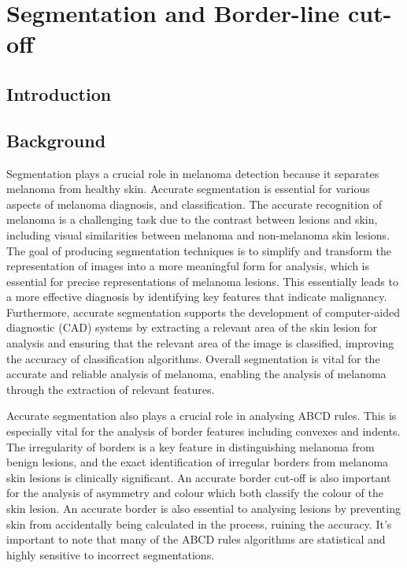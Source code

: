 \chapter{Segmentation and Border-line cut-off}

\section{Introduction}


\section{Background}
Segmentation plays a crucial role in melanoma detection because it separates melanoma from healthy skin. Accurate segmentation is essential for various aspects of melanoma diagnosis, and classification\cite{Albahli2020}. The accurate recognition of melanoma is a challenging task due to the contrast between lesions and skin, including visual similarities between melanoma and non-melanoma skin lesions\cite{li2018}. The goal of producing segmentation techniques is to simplify and transform the representation of images into a more meaningful form for analysis, which is essential for precise representations of melanoma lesions\cite{Masood2013}. This essentially leads to a more effective diagnosis by identifying key features that indicate malignancy\cite{ali2023}. Furthermore, accurate segmentation supports the development of computer-aided diagnostic (CAD) systems by extracting a relevant area of the skin lesion for analysis and ensuring that the relevant area of the image is classified, improving the accuracy of classification algorithms\cite{bi2019}. Overall segmentation is vital for the accurate and reliable analysis of melanoma, enabling the analysis of melanoma through the extraction of relevant features.

Accurate segmentation also plays a crucial role in analysing ABCD rules\cite{Lee2020}. This is especially vital for the analysis of border features\cite{Pereira2020, Kaya2016} including convexes and indents. The irregularity of borders is a key feature in distinguishing melanoma from benign lesions, and the exact identification of irregular borders from melanoma skin lesions is clinically significant\cite{patil2021}. An accurate border cut-off is also important for the analysis of asymmetry and colour which both classify the colour of the skin lesion. An accurate border is also essential to analysing lesions by preventing skin from accidentally being calculated in the process, ruining the accuracy. It's important to note that many of the ABCD rules algorithms are statistical and highly sensitive to incorrect segmentations.

